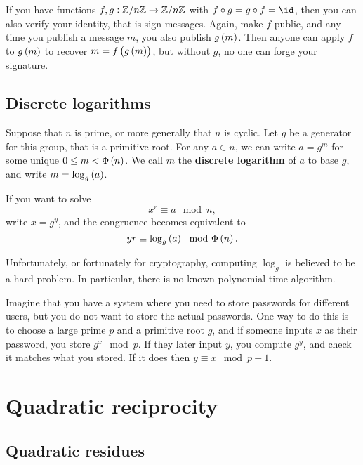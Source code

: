 
If you have functions $ f, g : \mathbb{Z} / n\mathbb{Z} \to \mathbb{Z} / n\mathbb{Z} $ with $ f \circ g = g \circ f = \id $, then you can also verify your identity, that is sign messages. Again, make $ f $ public, and any time you publish a message $ m $, you also publish $ g\br{m} $. Then anyone can apply $ f $ to $ g\br{m} $ to recover $ m = f\br{g\br{m}} $, but without $ g $, no one can forge your signature.

\subsection{Discrete logarithms}

Suppose that $ n $ is prime, or more generally that $ \unit{n} $ is cyclic. Let $ g $ be a generator for this group, that is a primitive root. For any $ a \in \unit{n} $, we can write $ a = g^m $ for some unique $ 0 \le m < \Phi\br{n} $. We call $ m $ the \textbf{discrete logarithm} of $ a $ to base $ g $, and write $ m = \log_g\br{a} $.

\begin{example*}
If you want to solve
$$ x^r \equiv a \mod n, $$
write $ x = g^y $, and the congruence becomes equivalent to
$$ yr \equiv \log_g\br{a} \mod \Phi\br{n}. $$
\end{example*}

Unfortunately, or fortunately for cryptography, computing $ \log_g $ is believed to be a hard problem. In particular, there is no known polynomial time algorithm.

\begin{example*}
Imagine that you have a system where you need to store passwords for different users, but you do not want to store the actual passwords. One way to do this is to choose a large prime $ p $ and a primitive root $ g $, and if someone inputs $ x $ as their password, you store $ g^x \mod p $. If they later input $ y $, you compute $ g^y $, and check it matches what you stored. If it does then $ y \equiv x \mod p - 1 $.
\end{example*}

\pagebreak

\section{Quadratic reciprocity}

\subsection{Quadratic residues}


